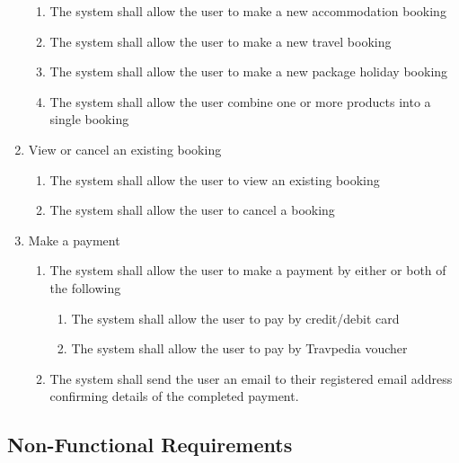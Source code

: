\begin{enumerate}
		\begin{enumerate}
			\item The system shall allow the user to make a new accommodation booking
			\item The system shall allow the user to make a new travel booking
			\item The system shall allow the user to make a new package holiday booking
			\item The system shall allow the user combine one or more products into
				a single booking
		\end{enumerate}
	\item View or cancel an existing booking

		\begin{enumerate}
			\item The system shall allow the user to view an existing booking
			\item The system shall allow the user to cancel a booking
		\end{enumerate}
	\item Make a payment

		\begin{enumerate}
			\item The system shall allow the user to make a payment by either or both
				of the following

				\begin{enumerate}
					\item The system shall allow the user to pay by credit/debit card
					\item The system shall allow the user to pay by Travpedia voucher
				\end{enumerate}
			\item The system shall send the user an email to their registered email
				address confirming details of the completed payment.
		\end{enumerate}
\end{enumerate}

\subsection{Non-Functional Requirements}

